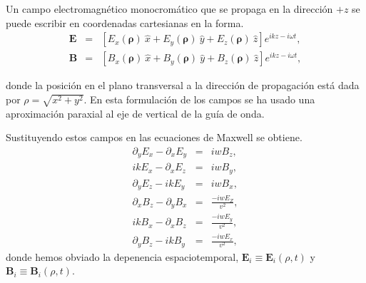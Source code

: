 \par Un campo electromagnético monocromático que se propaga en la dirección $+z$ se puede escribir en coordenadas cartesianas en la forma.
\begin{subequations}\label{Camposincidentes}
	\begin{eqnarray}
	\mathbf{E} &=& \left[E_{x}(\mathbf{\rho}) ~ \hat{x} + E_{y}(\mathbf{\rho})~ \hat{y} + E_{z}(\mathbf{\rho})~ \hat{z} \right] e^{ i k z - i \omega t }, \\
	\mathbf{B} &=& \left[B_{x}(\mathbf{\rho})~ \hat{x} + B_{y}(\mathbf{\rho})~ \hat{y} + B_{z}(\mathbf{\rho})~ \hat{z} \right] e^{i k z - i  \omega t},
	\end{eqnarray}
\end{subequations}
\par donde la posición en el plano transversal a la dirección de propagación está dada por $\rho = \sqrt{x^2 + y^2}$. En esta formulación de los campos se ha usado una aproximación paraxial al eje de vertical de la guía de onda.

Sustituyendo estos campos en las ecuaciones de Maxwell se obtiene\cite{GriffithsElec}.
\begin{subequations}\label{Camposexplicitos}
	\begin{eqnarray}
	\partial_{y} E_{x}-\partial_{x} E_{y} &=& i w B_{z}, \\
	i k E_{x}-\partial_{x} E_{z} &=& i w B_{y}, \\
	\partial_{y} E_{z}-i k E_{y} &=& i w B_{x}, \\
	\partial_{x} B_{z}-\partial_{y} B_{x} &=& \frac{-iw E_{Z} }{v^2}, \\
	i k B_{x}-\partial_{x} B_{z} &=& \frac{-iw E_{y} }{v^2} ,\\
	\partial_{y} B_{z}- i k B_{y} &=& \frac{-iw E_{x} }{v^2},
	\end{eqnarray}
\end{subequations}
donde hemos obviado la depenencia espaciotemporal, $\mathbf{E}_{i} \equiv \mathbf{E}_{i}(\rho,t)$ y $\mathbf{B}_{i} \equiv \mathbf{B}_{i}(\rho,t)$.

